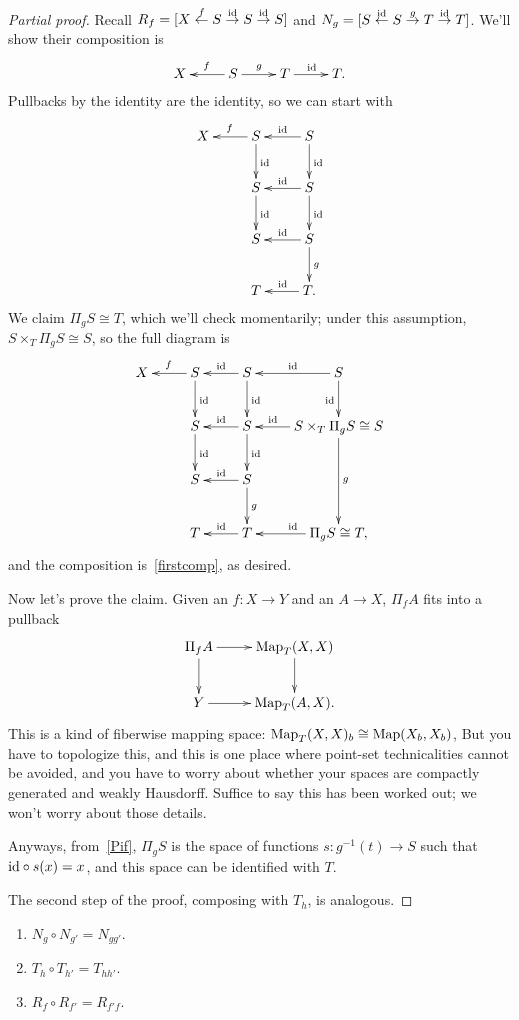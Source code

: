\begin{proof}[Partial proof]
Recall $R_f = [X\stackrel f\gets S\stackrel{\mathrm{id}}\to S\stackrel{\mathrm{id}}\to S]$ and $N_g = [S\stackrel{\mathrm{id}}\gets S\stackrel
g\to T\stackrel{\mathrm{id}}\to T]$. We'll show their composition is
\begin{equation}
\label{firstcomp}
\xymatrix{
	X & S\ar[l]_f\ar[r]^g & T\ar[r]^\id &T.
}
\end{equation}
Pullbacks by the identity are the identity, so we can start with
\[\xymatrix{
X & S\ar[l]_f\ar[d]^\id & S\ar[l]_\id\ar[d]^\id\\
& S\ar[d]^\id & S\ar[l]_\id\ar[d]^\id\\
& S & S\ar[l]_\id\ar[d]^g\\
& T & T.\ar[l]_\id
}\]
We claim $\Pi_gS\cong T$, which we'll check momentarily; under this assumption, $S\times_T \Pi_g S\cong S$, so the
full diagram is
\[\xymatrix{
X & S\ar[l]_f\ar[d]^\id & S\ar[l]_\id\ar[d]^\id &S\ar[l]_\id\ar[d]_\id\\
& S\ar[d]^\id & S\ar[l]_\id\ar[d]^\id & S\times_T\Pi_gS\cong S\ar[dd]^g\ar[l]_-\id\\
& S & S\ar[l]_\id\ar[d]^g\\
& T & T\ar[l]_\id & \Pi_g S\cong T,\ar[l]_\id
}\]
and the composition is~\eqref{firstcomp}, as desired.

Now let's prove the claim. Given an $f\colon X\to Y$ and an $A\to X$, $\Pi_f A$ fits into a pullback
\begin{equation}
\label{Pif}
\gathxy{
	\Pi_f A\ar[r]\ar[d] & \Map_T(X,X)\ar[d]\\
	Y\ar[r] & \Map_T(A,X).
}
\end{equation}
This is a kind of fiberwise mapping space: $\operatorname{Map}_T(X,X)_b\cong \operatorname{Map}(X_b, X_b)$, But you have to topologize this,
and this is one place where point-set technicalities cannot be avoided, and you have to worry about whether your
spaces are compactly generated and weakly Hausdorff. Suffice to say this has been worked out; we won't worry about
those details.

Anyways, from~\eqref{Pif}, $\Pi_g S$ is the space of functions $s\colon g^{-1}(t)\to S$ such that $\mathrm{id}\circ s(x) =
x$, and this space can be identified with $T$.

The second step of the proof, composing with $T_h$, is analogous.
\end{proof}
\begin{prop}\hfill
\label{NTRcomp}
\begin{enumerate}
	\item $N_g\circ N_{g'} = N_{gg'}$.
	\item\label{hh'} $T_h\circ T_{h'} = T_{hh'}$.
	\item $R_f\circ R_{f'} = R_{f'f}$.
\end{enumerate}
\end{prop}
